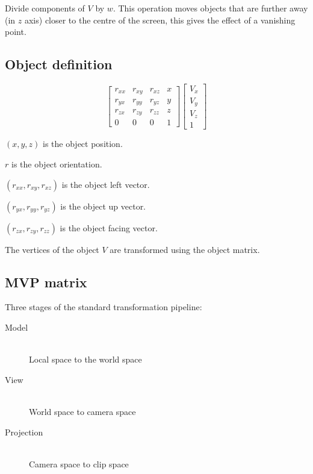 \documentclass[a4paper]{article}
\begin{document}
Divide components of $V$ by $w$. This operation moves objects that are further
away (in $z$ axis) closer to the centre of the screen, this gives the effect of
a vanishing point.

\subsection{Object definition}

\[
  \left [
    \begin{array}{cccc}
      r_{xx}  & r_{xy}  & r_{xz}  & x \\
      r_{yx}  & r_{yy}  & r_{yz}  & y \\
      r_{zx}  & r_{zy}  & r_{zz}  & z \\
      0       & 0       & 0       & 1
    \end{array}
  \right ]
  \left [
    \begin{array}{c}
      V_{x} \\
      V_{y} \\
      V_{z} \\
      1
    \end{array}
  \right ]
\]

$(x, y, z)$ is the object position.

$r$ is the object orientation.

$(r_{xx}, r_{xy}, r_{xz})$ is the object left vector.

$(r_{yx}, r_{yy}, r_{yz})$ is the object up vector.

$(r_{zx}, r_{zy}, r_{zz})$ is the object facing vector.

The vertices of the object $V$ are transformed using the object matrix.

\subsection{MVP matrix}

Three stages of the standard transformation pipeline:

\begin{description}
  \item[Model] \hfill \\
    Local space to the world space

  \item[View] \hfill \\
    World space to camera space

  \item[Projection] \hfill \\
    Camera space to clip space

\end{description}
\end{document}
